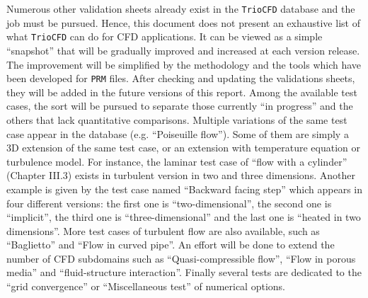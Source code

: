 Numerous other validation sheets already exist in the \texttt{TrioCFD}
database and the job must be pursued. Hence, this document does not
present an exhaustive list of what \texttt{TrioCFD} can do for CFD
applications. It can be viewed as a simple ``snapshot'' that will
be gradually improved and increased at each version release. The improvement
will be simplified by the methodology and the tools which have been
developed for \texttt{PRM} files. After checking and updating the
validations sheets, they will be added in the future versions of this
report. Among the available test cases, the sort will be pursued to
separate those currently ``in progress'' and the others that lack
quantitative comparisons. Multiple variations of the same test case
appear in the database (e.g. ``Poiseuille flow''). Some of them
are simply a 3D extension of the same test case, or an extension with
temperature equation or turbulence model. For instance, the laminar
test case of ``flow with a cylinder'' (Chapter III.3) exists in
turbulent version in two and three dimensions. Another example is
given by the test case named ``Backward facing step'' which appears
in four different versions: the first one is ``two-dimensional'',
the second one is ``implicit'', the third one is ``three-dimensional''
and the last one is ``heated in two dimensions''. More test cases
of turbulent flow are also available, such as ``Baglietto'' and
``Flow in curved pipe''. An effort will be done to extend the
number of CFD subdomains such as ``Quasi-compressible flow'', ``Flow
in porous media'' and ``fluid-structure interaction''. Finally
several tests are dedicated to the ``grid convergence'' or ``Miscellaneous
test'' of numerical options.
